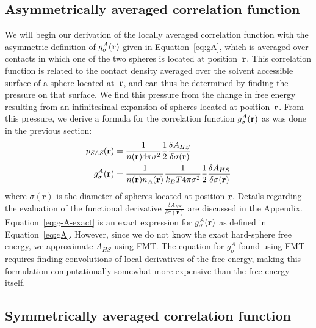 \subsection{Asymmetrically averaged correlation function}\label{sec:g-A}

We will begin our derivation of the locally averaged correlation
function with the asymmetric definition of $g_\sigma^A(\textbf{r})$ given in
Equation~\ref{eq:gA}, which is averaged over contacts in which one of
the two spheres is located at position~$\textbf{r}$.  This correlation
function is related to the contact density averaged over the solvent accessible surface
of a sphere located at~$\textbf{r}$, and can thus be determined by finding
the pressure on that surface.  We find this pressure from the change in
free energy resulting from an infinitesimal expansion of spheres
located at position~$\textbf{r}$.  From this pressure, we derive a
formula for the correlation function $g_\sigma^A(\textbf{r})$ as was done in
the previous section:
\begin{align}
  p_{\textit{SAS}}(\mathbf{r}) &= \frac{1}{n(\rr) 4\pi \sigma^2}\frac12 \frac{\delta
    A_{HS}}{\delta \sigma(\mathbf{r})} \label{eq:p_{HS}^A}\\
  g_\sigma^A(\rr)%
  &= \frac{1}{n(\rr) n_A(\rr)}\frac{1}{ k_BT 4\pi \sigma^2}\frac12 \frac{\delta
    A_{HS}}{\delta \sigma(\mathbf{r})} \label{eq:g-A-exact}
\end{align}
where $\sigma(\mathbf{r})$ is the diameter of spheres located at position $\textbf{r}$.
Details regarding the evaluation of the functional derivative
$\frac{\delta A_{HS}}{\delta \sigma(\mathbf{r})}$
are discussed in the Appendix.
Equation~\ref{eq:g-A-exact} is an exact expression for
$g_\sigma^A(\textbf{r})$ as defined in Equation~\ref{eq:gA}.  However, since
we do not know the exact hard-sphere free energy, we approximate
$A_{HS}$ using FMT.
The equation for $g_\sigma^A$ found using FMT requires finding
convolutions of local derivatives of the free energy, making this
formulation computationally somewhat more expensive than the free
energy itself.

\derivation{
  \end{widetext}
}

\subsection{Symmetrically averaged correlation function}\label{sec:g-S}

